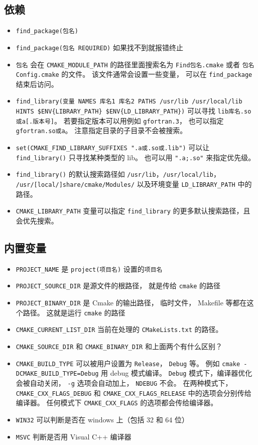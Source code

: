 \subsection{依赖}
\begin{itemize}
\item \verb|find_package(包名)|
\item \verb`find_package(包名 REQUIRED)` 如果找不到就报错终止
\item \verb|包名| 会在 \verb|CMAKE_MODULE_PATH| 的路径里面搜索名为 \verb|Find包名.cmake| 或者 \verb`包名Config.cmake` 的文件。 该文件通常会设置一些变量， 可以在 \verb|find_package| 结束后访问。
\item \verb|find_library(变量 NAMES 库名1 库名2 PATHS /usr/lib /usr/local/lib HINTS $ENV{LIBRARY_PATH} $ENV{LD_LIBRARY_PATH})| 可以寻找 \verb|lib库名.so或a[.版本号]|。 若要指定版本可以用例如 \verb|gfortran.3|， 也可以指定 \verb|gfortran.so或a|。 注意指定目录的子目录不会被搜索。
\item \verb|set(CMAKE_FIND_LIBRARY_SUFFIXES ".a或.so或.lib")| 可以让 \verb|find_library()| 只寻找某种类型的 lib。 也可以用 \verb|".a;.so"| 来指定优先级。
\item \verb|find_library()| 的默认搜索路径如 \verb`/usr/lib`，\verb`/usr/local/lib`， \verb`/usr/[local/]share/cmake/Modules/` 以及环境变量 \verb`LD_LIBRARY_PATH` 中的路径。 
\item \verb`CMAKE_LIBRARY_PATH` 变量可以指定 \verb`find_library` 的更多默认搜索路径，且会优先搜索。
\end{itemize}

\subsection{内置变量}
\begin{itemize}
\item \verb|PROJECT_NAME| 是 \verb|project(项目名)| 设置的\verb`项目名`
\item \verb`PROJECT_SOURCE_DIR` 是源文件的根路径， 就是传给 \verb`cmake` 的路径
\item \verb`PROJECT_BINARY_DIR` 是 Cmake 的输出路径， 临时文件， Makefile 等都在这个路径。 这就是运行 \verb`cmake` 的路径
\item \verb|CMAKE_CURRENT_LIST_DIR| 当前在处理的 \verb|CMakeLists.txt| 的路径。
\item \verb|CMAKE_SOURCE_DIR| 和 \verb|CMAKE_BINARY_DIR| 和上面两个有什么区别？
\item \verb|CMAKE_BUILD_TYPE| 可以被用户设置为 \verb|Release|， \verb|Debug| 等。 例如 \verb|cmake -DCMAKE_BUILD_TYPE=Debug| 用 debug 模式编译。 \verb|Debug| 模式下，编译器优化会被自动关闭， \verb|-g| 选项会自动加上， \verb|NDEBUG| 不会。 在两种模式下， \verb|CMAKE_CXX_FLAGS_DEBUG| 和 \verb|CMAKE_CXX_FLAGS_RELEASE| 中的选项会分别传给编译器。 任何模式下 \verb|CMAKE_CXX_FLAGS| 的选项都会传给编译器。
\item \verb|WIN32| 可以判断是否在 windows 上（包括 32 和 64 位）
\item \verb|MSVC| 判断是否用 Visual C++ 编译器
\end{itemize}

